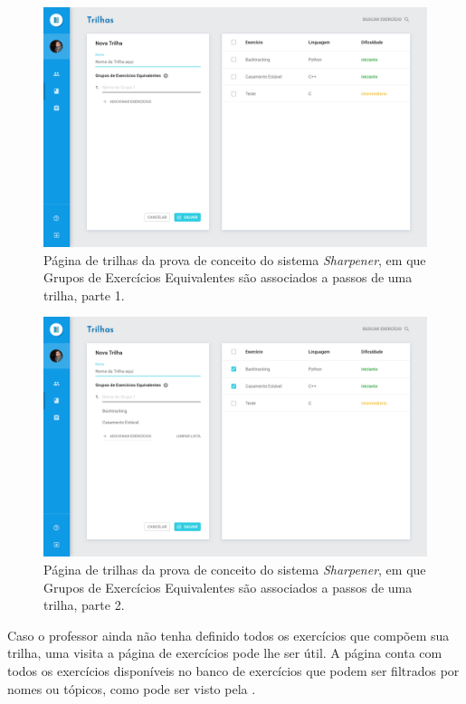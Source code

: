   \begin{figure}[htpb]
  \centering
  \includegraphics[width=\linewidth]{images/mocks/trackAdd3.png}
  \caption{Página de trilhas da prova de conceito do sistema \emph{Sharpener}, 
	  em que Grupos de Exercícios Equivalentes são associados a passos de uma trilha, parte 1.}%
  \label{fig:add_track3}
  \end{figure}
  
  \begin{figure}[htpb]
  \centering
  \includegraphics[width=\linewidth]{images/mocks/trackAdd4.png}
  \caption{Página de trilhas da prova de conceito do sistema \emph{Sharpener}, 
	  em que Grupos de Exercícios Equivalentes são associados a passos de uma trilha, parte 2.}%
  \label{fig:add_track4}
  \end{figure}

Caso o professor ainda não tenha definido todos os exercícios que compõem sua trilha, uma visita a página de exercícios pode lhe 
ser útil. A página conta com todos os exercícios disponíveis no banco de exercícios que podem ser filtrados por nomes ou tópicos, 
como pode ser visto pela .

